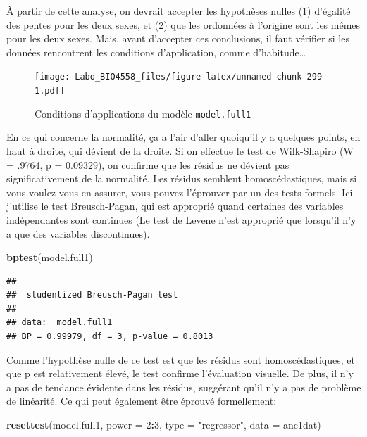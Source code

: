 \documentclass[12pt,]{book}
\newenvironment{Shaded}{\begin{snugshade}}{\end{snugshade}}
\newcommand{\DataTypeTok}[1]{\textcolor[rgb]{0.13,0.29,0.53}{#1}}
\newcommand{\DecValTok}[1]{\textcolor[rgb]{0.00,0.00,0.81}{#1}}
\newcommand{\KeywordTok}[1]{\textcolor[rgb]{0.13,0.29,0.53}{\textbf{#1}}}
\newcommand{\NormalTok}[1]{#1}
\newcommand{\OperatorTok}[1]{\textcolor[rgb]{0.81,0.36,0.00}{\textbf{#1}}}
\newcommand{\StringTok}[1]{\textcolor[rgb]{0.31,0.60,0.02}{#1}}
\begin{document}
À partir de cette analyse, on devrait accepter les hypothèses nulles (1) d'égalité des pentes pour les deux sexes, et (2) que les ordonnées à l'origine sont les mêmes pour les deux sexes. Mais, avant d'accepter ces conclusions, il faut vérifier si les données rencontrent les conditions d'application, comme d'habitude\ldots{}

\begin{figure}
\centering
\texttt{[image: Labo\_BIO4558\_files/figure-latex/unnamed-chunk-299-1.pdf]}
\caption{\label{fig:unnamed-chunk-299}Conditions d'applications du modèle \texttt{model.full1}}
\end{figure}

En ce qui concerne la normalité, ça a l'air d'aller quoiqu'il y a quelques points, en haut à droite, qui dévient de la droite. Si on effectue le test de Wilk-Shapiro (W = .9764, p = 0.09329), on confirme que les résidus ne dévient pas significativement de la normalité. Les résidus semblent homoscédastiques, mais si vous voulez vous en assurer, vous pouvez l'éprouver par un des tests formels. Ici j'utilise le test Breusch-Pagan, qui est approprié quand certaines des variables indépendantes sont continues (Le test de Levene n'est approprié que lorsqu'il n'y a que des variables discontinues).

\begin{Shaded}
\begin{Highlighting}[]
\KeywordTok{bptest}\NormalTok{(model.full1)}
\end{Highlighting}
\end{Shaded}

\begin{verbatim}
## 
##  studentized Breusch-Pagan test
## 
## data:  model.full1
## BP = 0.99979, df = 3, p-value = 0.8013
\end{verbatim}

Comme l'hypothèse nulle de ce test est que les résidus sont homoscédastiques, et que p est relativement élevé, le test confirme l'évaluation visuelle. De plus, il n'y a pas de tendance évidente dans les résidus, suggérant qu'il n'y a pas de problème de linéarité. Ce qui peut également être éprouvé formellement:

\begin{Shaded}
\begin{Highlighting}[]
\KeywordTok{resettest}\NormalTok{(model.full1, }\DataTypeTok{power =} \DecValTok{2}\OperatorTok{:}\DecValTok{3}\NormalTok{, }\DataTypeTok{type =} \StringTok{"regressor"}\NormalTok{, }\DataTypeTok{data =}\NormalTok{ anc1dat)}
\end{Highlighting}
\end{Shaded}
\end{document}
